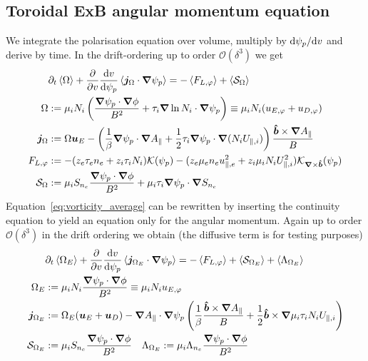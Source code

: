 \subsection{Toroidal ExB angular momentum equation} \label{sec:vorticity_eq}
We integrate the polarisation equation over volume, multiply by $\mathrm{d} \psi_p/\mathrm{d} v$ and derive by time. In the drift-ordering up to order $\mathcal O(\delta^3)$ we get
\begin{align}
    &\partial_t \left \langle \Omega \right \rangle + \frac{\partial}{\partial v}\frac{\mathrm{d} v}{\mathrm{d}\psi_p}\left \langle {\boldsymbol{j}}_\Omega\cdot{\boldsymbol{\nabla}}\psi_p \right \rangle = -\left \langle F_{L,\varphi} \right \rangle + \left \langle \mathcal S_\Omega \right \rangle \label{eq:vorticity_average} \\
\Omega &:= \mu_i N_i \left(\frac{{\boldsymbol{\nabla}}\psi_p\cdot{\boldsymbol{\nabla}}\phi}{B^2} + \tau_i {\boldsymbol{\nabla}}\ln N_i\cdot{\boldsymbol{\nabla}}\psi_p\right) \equiv \mu_i N_i(u_{E,\varphi} + u_{D,\varphi}) \\
{\boldsymbol{j}}_{\Omega} &:= \Omega {\boldsymbol{u}}_E
    - \left(\frac{1}{\beta} {\boldsymbol{\nabla}}\psi_p \cdot{\boldsymbol{\nabla}} A_\parallel +\frac{1}{2}\tau_i {\boldsymbol{\nabla}}\psi_p\cdot{\boldsymbol{\nabla}}  (N_iU_{\parallel,i})\right)\frac{\bm{\hat{b}}\times{\boldsymbol{\nabla}} A_\parallel}{B} \\
    F_{L,\varphi} &:=  -(z_e \tau_e n_e + z_i\tau_i N_i)\mathcal K(\psi_p) - (z_e\mu_e n_eu_{\parallel,e}^2 + z_i\mu_i N_iU_{\parallel,i}^2)\mathcal K_{{\boldsymbol{\nabla}}\times\bm{\hat{b}}}(\psi_p) \\
    \mathcal S_\Omega &:= \mu_i S_{n_e} \frac{{\boldsymbol{\nabla}}\psi_p\cdot{\boldsymbol{\nabla}} \phi}{B^2} + \mu_i\tau_i{\boldsymbol{\nabla}}\psi_p\cdot{\boldsymbol{\nabla}} S_{n_e} \label{eq:em_source}
\end{align}
Equation~\eqref{eq:vorticity_average} can be rewritten by inserting the continuity equation to yield an equation only for the \ExB angular momentum. Again up to order $\mathcal O(\delta^3)$ in the drift ordering we obtain
(the diffusive term is for testing purposes)
\begin{align}
&\partial_t \left \langle \Omega_E \right \rangle + \frac{\partial}{\partial v} \frac{\mathrm{d} v}{\mathrm{d} \psi_p}\left \langle  {\boldsymbol{j}}_{\Omega_E}\cdot{\boldsymbol{\nabla}}\psi_p \right \rangle = -\left \langle F_{L,\varphi} \right \rangle+ \left \langle \mathcal S_{\Omega_E} \right \rangle + \left \langle \Lambda_{\Omega_E} \right \rangle \label{eq:exb_average} \\
\Omega_E &:= \mu_i N_i \frac{{\boldsymbol{\nabla}}\psi_p\cdot{\boldsymbol{\nabla}}\phi}{B^2} \equiv \mu_i N_i u_{E,\varphi} \\
{\boldsymbol{j}}_{\Omega_E} &:= \Omega_E ({\boldsymbol{u}}_E + {\boldsymbol{u}}_D)
    - {\boldsymbol{\nabla}} A_\parallel\cdot{\boldsymbol{\nabla}}\psi_p \left(\frac{1}{\beta} \frac{\bm{\hat{b}}\times{\boldsymbol{\nabla}} A_\parallel}{B} +\frac{1}{2} \bm{\hat{b}} \times {\boldsymbol{\nabla}} \mu_i \tau_i N_iU_{\parallel,i}\right) \\
    \mathcal S_{\Omega_E} &:= \mu_i S_{n_e} \frac{{\boldsymbol{\nabla}}\psi_p\cdot{\boldsymbol{\nabla}}\phi}{B^2} \quad
    \Lambda_{\Omega_E} := \mu_i \Lambda_{n_e}\frac{{\boldsymbol{\nabla}}\psi_p\cdot{\boldsymbol{\nabla}}\phi}{B^2}
\end{align}
